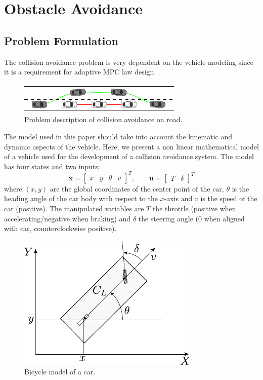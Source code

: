 \documentclass[conference, 11pt]{IEEEtran}
\begin{document}
\section{Obstacle Avoidance}
\subsection{Problem Formulation}
The collision avoidance problem is very dependent on the vehicle modeling since it is a requirement for  adaptive MPC law design. 
\begin{figure}[!h]
	\centering
	\includegraphics[width=1\columnwidth]{./figure/obstacleAvoidance/obstacleAvoidance.pdf}
	\caption{Problem description of collision avoidance on road.}
	\label{fig:obstacleAvoidance}
\end{figure}
The model used in this paper should take into account the kinematic and dynamic aspects of the vehicle. Here, we present a non linear mathematical model of a vehicle used for the development of a collision avoidance system.
The model has four states and two inputs:
\[ 
\textbf{x}=\begin{bmatrix}
   x&y&\theta&v 
  \end{bmatrix}^{T}
,\qquad 
\textbf{u}=\begin{bmatrix}
T&\delta 
\end{bmatrix}^{T}
\]
where $(x,y)$ are the global coordinates of the center point of the car, $\theta$ is the heading angle of the car body with respect to the $x$-axis and $v$ is the speed of the car (positive). The manipulated variables are $T$ the throttle (positive when accelerating/negative when braking) and $\delta$ the steering angle ($0$ when aligned with car, counterclockwise positive).
\begin{figure}[!h]
	\centering
	\includegraphics[width=0.70\columnwidth]{./figure/car_model.pdf}
	\caption{Bicycle model of a car.}
	\label{fig:car_model}
\end{figure}
\end{document}
